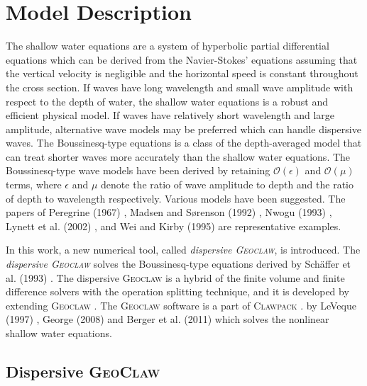 \documentclass[review]{elsarticle}
\begin{document}
\fi

\section{Model Description}

The shallow water equations
are a system of hyperbolic partial differential equations
which can be derived from 
the Navier-Stokes' equations
assuming that the vertical velocity is negligible and 
the horizontal speed is constant throughout the cross section. 
If waves have long wavelength and small wave amplitude 
with respect to the depth of water,
the shallow water equations is
a robust and efficient physical model. 
If waves have relatively short wavelength and large amplitude,
alternative wave models may be preferred 
which can handle dispersive waves. 
The Boussinesq-type equations
is a class of the depth-averaged model 
that can treat shorter waves more accurately
than the shallow water equations. 
The Boussinesq-type wave models have been derived by retaining 
$\mathcal{O}(\epsilon)$ and $\mathcal{O}(\mu)$ terms, 
where $\epsilon$ and $\mu$ 
denote the ratio of wave amplitude to depth
and the ratio of depth to wavelength respectively. 
Various models have been suggested.  
The papers of Peregrine (1967) \citep{peregrine1967long},
Madsen and S{\o}renson (1992) \citep{madsen1992new}, Nwogu (1993) \citep{nwogu1993alternative}, Lynett et al. (2002) \cite{lynett2002modeling},
and Wei and Kirby (1995) \citep{wei1995time}
are representative examples. 

In this work, a new numerical tool, 
called {\em dispersive \textsc{Geoclaw}}, is introduced. 
The {\em dispersive \textsc{Geoclaw}} solves 
the Boussinesq-type equations derived by
Sch{\"a}ffer et al. (1993) \citep{schaffer1993boussinesq}.
The dispersive \textsc{Geoclaw}
is a hybrid of the finite volume and finite difference solvers
with the operation splitting technique,
and it is developed by extending \textsc{Geoclaw} \citep{clawpack}.
The \textsc{Geoclaw} software is 
a part of \textsc{Clawpack} \citep{clawpack}.
by LeVeque (1997) \cite{leveque1997wave}, George (2008) \citep{george2008augmented} and Berger et al. (2011) \citep{BergerGeorgeLeVequeMandli11}
which solves the nonlinear shallow water equations.

\subsection{Dispersive \textsc{GeoClaw}}
\end{document}
